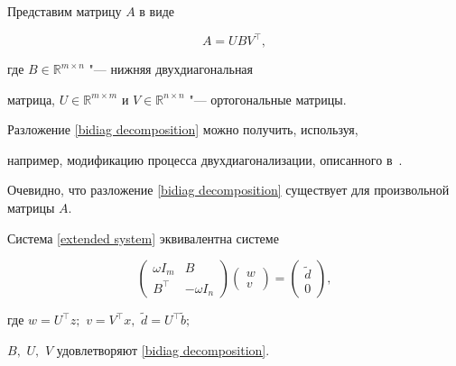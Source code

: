 Представим матрицу $A$ в виде

\begin{equation}

\label{bidiag decomposition} A = U B V^\top   ,

\end{equation}

где $B \in {\mathbb{R}}^{m \times n}$ "--- нижняя двухдиагональная

матрица, $U \in {\mathbb{R}}^{m \times m}$ и $V \in {\mathbb{R}}^{n

\times n}$ "--- ортогональные матрицы.



Разложение \eqref{bidiag decomposition} можно получить, используя,

например, модификацию процесса двухдиагонализации, описанного в~{\cite{dolishzhdanov:bib:golub}}.



Очевидно, что разложение \eqref{bidiag decomposition} существует для произвольной матрицы $A$.



\begin{lemma}

Система \eqref{extended system} эквивалентна системе

\begin{equation}

\label{extended bidiag system} \left(

\begin{array}{cc}

{\omega I_m} & B \\ B^\top    & {-\omega I_n}

\end{array}

\right) \left(

\begin{array}{c}

w \\ v

\end{array}

\right) = \left(

\begin{array}{c}

{\widetilde{d}} \\ 0

\end{array}

\right),

\end{equation}

где $w = U^\top    z;$ $v = V^\top    x,$ $\widetilde{d}=U^\top    \widetilde{b};$ 

$B,$ $U,$ $V$ удовлетворяют \eqref{bidiag decomposition}$.$

\end{lemma}







